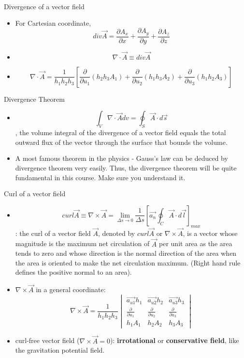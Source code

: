 \documentclass[xcolor={dvipsnames}]{beamer}
\begin{document}
\begin{frame}{Divergence of a vector field}
\begin{itemize}
    \item For Cartesian coordinate, 
    $$div\vec{A} = \frac{\partial A_x}{\partial x} + \frac{\partial A_y}{\partial y} + \frac{\partial A_z}{\partial z}$$
    \item $$\nabla \cdot \vec{A} \equiv div \vec{A}$$
    \item $$\nabla \cdot \vec{A} = \frac{1}{h_1h_2h_3}[\frac{\partial}{\partial u_1}(h_2h_3A_1)+\frac{\partial}{\partial u_2}(h_1h_3A_2)+\frac{\partial}{\partial u_3}(h_1h_2A_3)]$$
\end{itemize}
\end{frame}
\begin{frame}{Divergence Theorem}
\begin{itemize}
    \item $$\int_V\nabla\cdot \vec{A}dv = \oint_S\vec{A}\cdot d\vec{s}$$, the volume integral of the divergence of a vector field equals the total outward flux of the vector through the surface that bounds the volume.
    \item A most famous theorem in the physics - Gauss's law can be deduced by divergence theorem very easily. Thus, the divergence theorem will be quite fundamental in this course. Make sure you understand it.
\end{itemize}
\end{frame}
\begin{frame}{Curl of a vector field}
\begin{itemize}
    \item $$curl \vec{A}\equiv\nabla\times\vec{A}=\lim_{\Delta s\to 0}\frac{1}{\Delta s}[\vec{a_n}\oint_{C}\vec{A}\cdot d\vec{l}]_{max}$$: the curl of a vector field $\vec{A}$, denoted by $curl\vec{A}$ or $\nabla\times\vec{A}$, is a vector whose magnitude is the maximum net circulation of $\vec{A}$ per unit area as the area tends to zero and whose direction is the normal direction of the area when the area is oriented to make the net circulation maximum. (Right hand rule defines the positive normal to an area).
    \item $\nabla\times\vec{A}$ in a general coordinate:
    $$
    \nabla\times\vec{A}=\frac{1}{h_1h_2h_3}\begin{vmatrix}
        \vec{a_{u1}}h_1 & \vec{a_{u2}}h_2 &\vec{a_{u3}}h_3\\
        \frac{\partial}{\partial u_1} & \frac{\partial}{\partial u_2} &\frac{\partial}{\partial u_3}\\
        h_1A_1 & h_2A_2 & h_3A_3
    \end{vmatrix}
    $$
    \item curl-free vector field ($\nabla\times\vec{A}=0$): \textbf{irrotational} or \textbf{conservative field}, like the gravitation potential field.
\end{itemize}
\end{frame}
\end{document}

